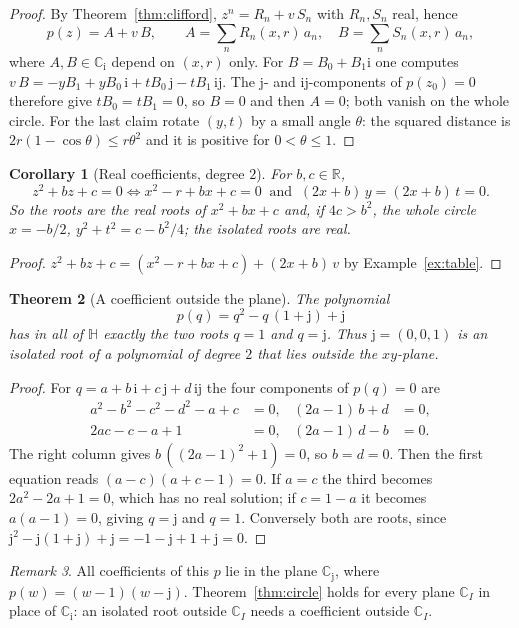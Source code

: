 \documentclass[11pt,a4paper]{article}
\newcommand{\ii}{\mathrm{i}}
\newcommand{\jj}{\mathrm{j}}
\newcommand{\R}{\mathbb{R}}
\newcommand{\HH}{\mathbb{H}}
\newtheorem{theorem}{Theorem}
\newtheorem{corollary}[theorem]{Corollary}
\theoremstyle{remark}
\newtheorem{remark}[theorem]{Remark}
\begin{document}
\begin{proof}
By Theorem~\ref{thm:clifford}, $z^n=R_n+v\,S_n$ with $R_n,S_n$ real, hence
\[
  p(z)=A+v\,B,\qquad A=\sum_nR_n(x,r)\,a_n,\quad B=\sum_nS_n(x,r)\,a_n,
\]
where $A,B\in\mathbb{C}_{\ii}$ depend on $(x,r)$ only. For $B=B_0+B_1\ii$ one computes
$v\,B=-yB_1+yB_0\,\ii+tB_0\,\jj-tB_1\,\ii\jj$. The $\jj$- and $\ii\jj$-components of
$p(z_0)=0$ therefore give $tB_0=tB_1=0$, so $B=0$ and then $A=0$; both vanish on the whole
circle. For the last claim rotate $(y,t)$ by a small angle $\theta$: the squared
distance is $2r(1-\cos\theta)\le r\theta^2$ and it is positive for $0<\theta\le1$.
\end{proof}

\begin{corollary}[Real coefficients, degree $2$]\label{cor:realquad}
For $b,c\in\R$,
\[
  z^2+bz+c=0\iff x^2-r+bx+c=0\ \text{ and }\ (2x+b)\,y=(2x+b)\,t=0 .
\]
So the roots are the real roots of $x^2+bx+c$ and, if $4c>b^2$, the whole circle
$x=-b/2$, $y^2+t^2=c-b^2/4$; the isolated roots are real.
\end{corollary}

\begin{proof}
$z^2+bz+c=(x^2-r+bx+c)+(2x+b)\,v$ by Example~\ref{ex:table}.
\end{proof}

\begin{theorem}[A coefficient outside the plane]\label{thm:jpoly}
The polynomial
\[
  \boxed{\;p(q)=q^2-q\,(1+\jj)+\jj\;}
\]
has in all of $\HH$ exactly the two roots $q=1$ and $q=\jj$. Thus $\jj=(0,0,1)$ is an isolated
root of a polynomial of degree $2$ that lies outside the $xy$-plane.
\end{theorem}

\begin{proof}
For $q=a+b\,\ii+c\,\jj+d\,\ii\jj$ the four components of $p(q)=0$ are
\begin{align*}
  a^2-b^2-c^2-d^2-a+c&=0, & (2a-1)\,b+d&=0,\\
  2ac-c-a+1&=0, & (2a-1)\,d-b&=0 .
\end{align*}
The right column gives $b\,((2a-1)^2+1)=0$, so $b=d=0$. Then the first equation reads
$(a-c)(a+c-1)=0$. If $a=c$ the third becomes $2a^2-2a+1=0$, which has no real solution; if
$c=1-a$ it becomes $a(a-1)=0$, giving $q=\jj$ and $q=1$. Conversely both are roots, since
$\jj^2-\jj(1+\jj)+\jj=-1-\jj+1+\jj=0$.
\end{proof}

\begin{remark}
All coefficients of this $p$ lie in the plane $\mathbb{C}_{\jj}$, where $p(w)=(w-1)(w-\jj)$.
Theorem~\ref{thm:circle} holds for every plane $\mathbb{C}_I$ in place of $\mathbb{C}_{\ii}$: an
isolated root outside $\mathbb{C}_I$ needs a coefficient outside $\mathbb{C}_I$.
\end{remark}
\end{document}
